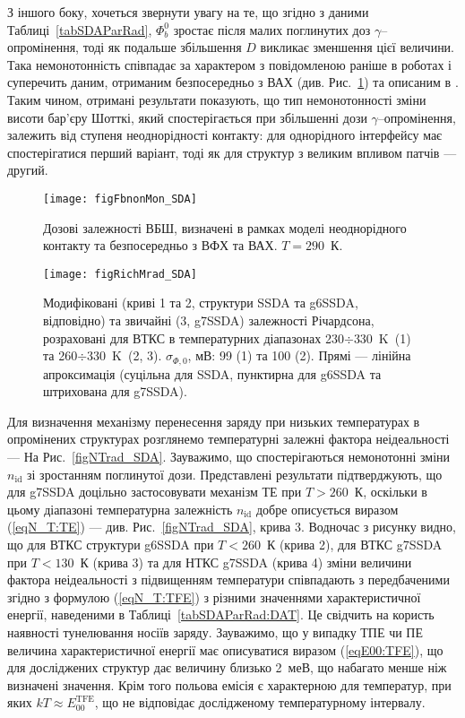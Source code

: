 З іншого боку, хочеться звернути увагу на те, що згідно з даними Таблиці~\ref{tabSDAParRad},
$\Phi_b^0$ зростає після малих поглинутих доз $\gamma$--опромінення, тоді як подальше збільшення $D$ викликає зменшення
цієї величини.
Така немонотонність співпадає за характером з повідомленою раніше в роботах \cite{Karatas:2006NIMA, Vorobets, Pattabi} і суперечить
даним, отриманим безпосередньо з ВАХ (див. Рис.~\ref{figFbnonMon_SDA})  та описаним в \cite{Umana,Verma}.
Таким чином, отримані результати показують, що тип немонотонності зміни висоти бар'єру Шотткі, який спостерігається
при збільшенні дози $\gamma$--опромінення,
залежить від ступеня неоднорідності контакту:
для однорідного інтерфейсу має спостерігатися перший варіант,
тоді як для структур з великим впливом патчів --- другий.

\begin{figure}
\center
\texttt{[image: figFbnonMon\_SDA]}
\caption{\label{figFbnonMon_SDA}
Дозові залежності ВБШ, визначені в рамках моделі неоднорідного контакту та безпосередньо з ВФХ та ВАХ.
$T=290$~К.
}%
\end{figure}

\begin{figure}
\center
\texttt{[image: figRichMrad\_SDA]}
\caption{\label{figRichMrad_SDA}
Модифіковані (криві 1 та 2, структури SSDA та g6SSDA, відповідно) та звичайні (3, g7SSDA) залежності Річардсона, розраховані для ВТКС в
температурних діапазонах 230$\div$330~K~(1) та 260$\div$330~K~(2, 3).
$\sigma_{\Phi,0}$, мВ: 99 (1) та 100 (2).
Прямі  --- лінійна апроксимація (суцільна для SSDA, пунктирна для g6SSDA та
штрихована для g7SSDA).
}%
\end{figure}

Для визначення механізму перенесення заряду при низьких температурах
в опромінених структурах розглянемо температурні залежні фактора неідеальності --- На Рис.~\ref{figNTrad_SDA}.
Зауважимо, що спостерігаються немонотонні зміни $n_\mathrm{id}$ зі зростанням поглинутої дози.
Представлені результати підтверджують, що для g7SSDA доцільно застосовувати механізм ТЕ при $T>260$~К,
оскільки в цьому діапазоні температурна залежність $n_\mathrm{id}$ добре описується виразом (\ref{eqN_T:TE})  --- див. Рис.~\ref{figNTrad_SDA}, крива 3.
Водночас з рисунку видно, що для ВТКС структури g6SSDA при $T<260$~К (крива 2), для ВТКС g7SSDA при $T<130$~К (крива 3) та для НТКС g7SSDA (крива 4)
зміни величини фактора неідеальності з підвищенням температури співпадають з передбаченими згідно з формулою (\ref{eqN_T:TFE}) з різними значеннями характеристичної
енергії, наведеними в Таблиці~\ref{tabSDAParRad:DAT}.
Це свідчить на користь наявності тунелювання носіїв заряду.
Зауважимо, що у випадку ТПЕ чи ПЕ величина характеристичної енергії має описуватися
виразом (\ref{eqE00:TFE}),
що для досліджених структур дає величину близько 2~меВ, що набагато менше ніж визначені значення.
Крім того польова емісія є характерною для температур, при яких $kT\approx E_{00}^\mathrm{TFE}$, що не відповідає дослідженому температурному
інтервалу.


